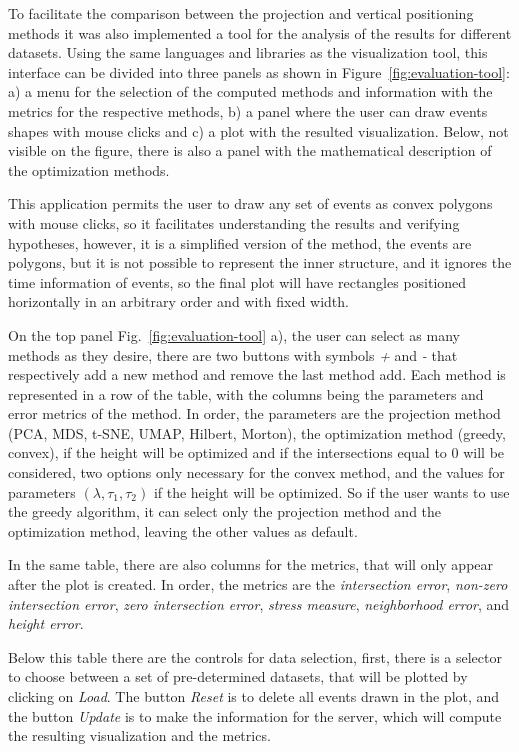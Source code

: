 To facilitate the comparison between the projection and vertical positioning methods it was also implemented a tool for the analysis of the results for different datasets.
%
Using the same languages and libraries as the visualization tool, this interface can be divided into three panels as shown in Figure~\ref{fig:evaluation-tool}: a) a menu for the selection of the computed methods and information with the metrics for the respective methods, b) a panel where the user can draw events shapes with mouse clicks and c) a plot with the resulted visualization.
%
Below, not visible on the figure, there is also a panel with the mathematical description of the optimization methods.

%
This application permits the user to draw any set of events as convex polygons with mouse clicks, so it facilitates understanding the results and verifying hypotheses, 
%
however, it is a simplified version of the method,
%
the events are polygons, but it is not possible to represent the inner structure,
and it ignores the time information of events, 
%
so the final plot will have rectangles positioned horizontally in an arbitrary order and with fixed width.

On the top panel Fig.~\ref{fig:evaluation-tool} a), the user can select as many methods as they desire, there are two buttons with symbols \textit{+} and \textit{-} that respectively add a new method and remove the last method add.
%
Each method is represented in a row of the table, with the columns being the parameters and error metrics of the method.
%
In order, the parameters are the projection method (PCA, MDS, t-SNE, UMAP, Hilbert, Morton), the optimization method (greedy, convex), if the height will be optimized and if the intersections equal to $0$ will be considered, two options only necessary for the convex method, and the values for parameters $(\lambda, \tau_1, \tau_2)$ if the height will be optimized.
%
So if the user wants to use the greedy algorithm, it can select only the projection method and the optimization method, leaving the other values as default.

In the same table, there are also columns for the metrics, that will only appear after the plot is created.
%
In order, the metrics are the \textit{intersection error}, \textit{non-zero intersection error}, \textit{zero intersection error}, \textit{stress measure}, \textit{neighborhood error}, and \textit{height error}.

Below this table there are the controls for data selection, first, there is a selector to choose between a set of pre-determined datasets, that will be plotted by clicking on \textit{Load}.
%
The button \textit{Reset} is to delete all events drawn in the plot, and the button \textit{Update} is to make the information for the server, which will compute the resulting visualization and the metrics.

